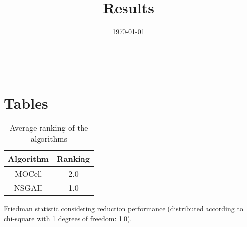 \documentclass{article}
\title{Results}
\author{}
\date{\today}
\begin{document}
\oddsidemargin 0in \topmargin 0in\maketitle
\
\section{Tables}
\begin{table}[!htp]
\centering
\caption{Average ranking of the algorithms}
\begin{tabular}{c|c}
Algorithm&Ranking\\
\hline
MOCell&2.0\\
NSGAII&1.0\\
\end{tabular}
\end{table}


Friedman statistic considering reduction performance (distributed according to chi-square with 1 degrees of freedom: 1.0).
\end{document}
